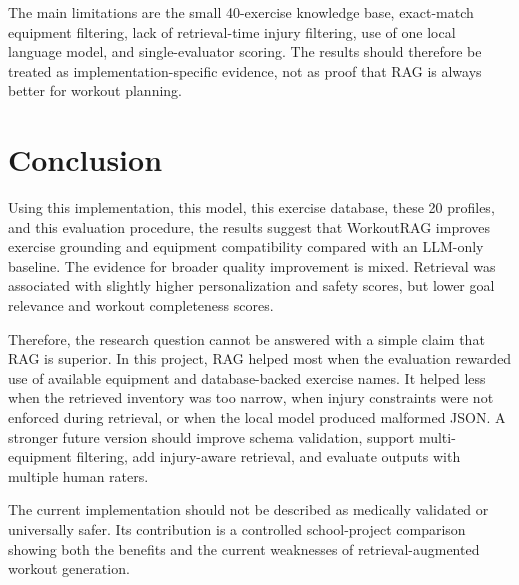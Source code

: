 \documentclass[12pt]{article}
\begin{document}
The main limitations are the small 40-exercise knowledge base, exact-match equipment filtering, lack of retrieval-time injury filtering, use of one local language model, and single-evaluator scoring. The results should therefore be treated as implementation-specific evidence, not as proof that RAG is always better for workout planning.

\section{Conclusion}
Using this implementation, this model, this exercise database, these 20 profiles, and this evaluation procedure, the results suggest that WorkoutRAG improves exercise grounding and equipment compatibility compared with an LLM-only baseline. The evidence for broader quality improvement is mixed. Retrieval was associated with slightly higher personalization and safety scores, but lower goal relevance and workout completeness scores.

Therefore, the research question cannot be answered with a simple claim that RAG is superior. In this project, RAG helped most when the evaluation rewarded use of available equipment and database-backed exercise names. It helped less when the retrieved inventory was too narrow, when injury constraints were not enforced during retrieval, or when the local model produced malformed JSON. A stronger future version should improve schema validation, support multi-equipment filtering, add injury-aware retrieval, and evaluate outputs with multiple human raters.

The current implementation should not be described as medically validated or universally safer. Its contribution is a controlled school-project comparison showing both the benefits and the current weaknesses of retrieval-augmented workout generation.



\end{document}
